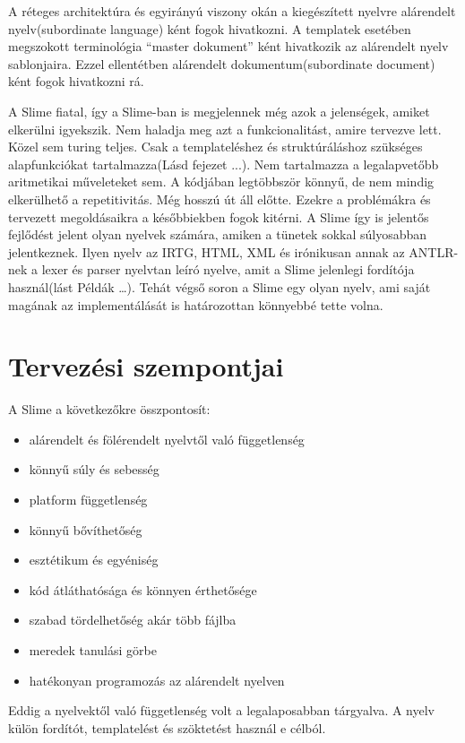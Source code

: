 A réteges architektúra és egyirányú viszony okán a kiegészített nyelvre alárendelt nyelv(subordinate language) ként fogok hivatkozni.
A templatek esetében megszokott terminológia “master dokument” ként hivatkozik az alárendelt nyelv sablonjaira.
Ezzel ellentétben alárendelt dokumentum(subordinate document) ként fogok hivatkozni rá. 

A Slime fiatal, így a Slime-ban is megjelennek még azok a jelenségek, amiket elkerülni igyekszik. 
Nem haladja meg azt a funkcionalitást, amire tervezve lett. 
Közel sem turing teljes. 
Csak a templateléshez és struktúráláshoz szükséges alapfunkciókat tartalmazza(Lásd fejezet ...). 
Nem tartalmazza a legalapvetőbb aritmetikai műveleteket sem. 
A kódjában legtöbbször könnyű, de nem mindig elkerülhető a repetitivitás. 
Még hosszú út áll előtte. 
Ezekre a problémákra és tervezett megoldásaikra a későbbiekben fogok kitérni. 
A Slime így is jelentős fejlődést jelent olyan nyelvek számára, amiken a tünetek sokkal súlyosabban jelentkeznek. 
Ilyen nyelv az IRTG, HTML, XML és irónikusan annak az ANTLR-nek a lexer és parser nyelvtan leíró nyelve, amit a Slime jelenlegi fordítója használ(lást Példák …). 
Tehát végső soron a Slime egy olyan nyelv, ami saját magának az implementálását is határozottan könnyebbé tette volna.


\section{Tervezési szempontjai}
A Slime a következőkre összpontosít:
\begin{itemize}
\item alárendelt és fölérendelt nyelvtől való függetlenség
\item könnyű súly és sebesség
\item platform függetlenség
\item könnyű bővíthetőség
\item esztétikum és egyéniség
\item kód átláthatósága és könnyen érthetősége
\item szabad tördelhetőség akár több fájlba
\item meredek tanulási görbe
\item hatékonyan programozás az alárendelt nyelven
\end{itemize}

Eddig a nyelvektől való függetlenség volt a legalaposabban tárgyalva. 
A nyelv külön fordítót, templatelést és szöktetést használ e célból.

